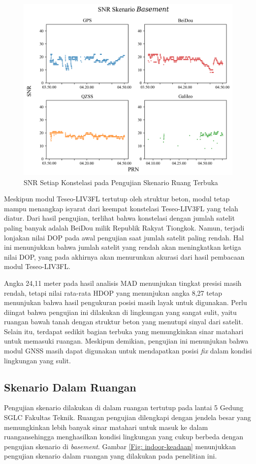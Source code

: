 \begin{figure}[H]
	\centering
	\includegraphics[width=13cm]{contents/chapter-4/1-skenario-basement/snr.png}
	\caption{SNR Setiap Konstelasi pada Pengujian Skenario Ruang Terbuka}
	\label{Fig: basement-snr}
\end{figure}

Meskipun modul Teseo-LIV3FL tertutup oleh struktur beton, modul tetap mampu menangkap isyarat dari keempat konstelasi Teseo-LIV3FL yang telah diatur. Dari hasil pengujian, terlihat bahwa konstelasi dengan jumlah satelit paling banyak adalah BeiDou milik Republik Rakyat Tiongkok. Namun, terjadi lonjakan nilai DOP pada awal pengujian saat jumlah satelit paling rendah. Hal ini menunjukkan bahwa jumlah satelit yang rendah akan meningkatkan ketiga nilai DOP, yang pada akhirnya akan menurunkan akurasi dari hasil pembacaan modul Teseo-LIV3FL.

Angka 24,11 meter pada hasil analisis MAD menunjukan tingkat presisi masih rendah, tetapi nilai rata-rata HDOP yang menunjukan angka 8,27 tetap menunjukan bahwa hasil pengukuran posisi masih layak untuk digunakan. Perlu diingat bahwa pengujian ini dilakukan di lingkungan yang sangat sulit, yaitu ruangan bawah tanah dengan struktur beton yang menutupi sinyal dari satelit. Selain itu, terdapat sedikit bagian terbuka yang memungkinkan sinar matahari untuk memasuki ruangan. Meskipun demikian, pengujian ini menunjukan bahwa modul GNSS masih dapat digunakan untuk mendapatkan posisi \textit{fix} dalam kondisi lingkungan yang sulit.

\subsection{Skenario Dalam Ruangan}
Pengujian skenario dilakukan di dalam ruangan tertutup pada lantai 5 Gedung SGLC Fakultas Teknik. Ruangan pengujian dilengkapi dengan jendela besar yang memungkinkan lebih banyak sinar matahari untuk masuk ke dalam ruangansehingga menghasilkan kondisi lingkungan yang cukup berbeda dengan pengujian skenario di \textit{basement}. Gambar \ref{Fig: indoor-keadaan} menunjukkan pengujian skenario dalam ruangan yang dilakukan pada penelitian ini.

